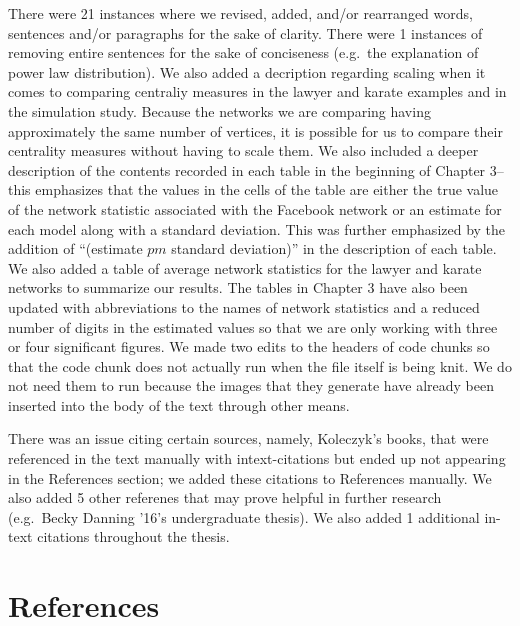 \documentclass[12pt,twoside]{amherstthesis}
\begin{document}
  There were 21 instances where we revised, added, and/or rearranged
  words, sentences and/or paragraphs for the sake of clarity. There were 1
  instances of removing entire sentences for the sake of conciseness
  (e.g.~the explanation of power law distribution). We also added a
  decription regarding scaling when it comes to comparing centraliy
  measures in the lawyer and karate examples and in the simulation study.
  Because the networks we are comparing having approximately the same
  number of vertices, it is possible for us to compare their centrality
  measures without having to scale them. We also included a deeper
  description of the contents recorded in each table in the beginning of
  Chapter 3--this emphasizes that the values in the cells of the table are
  either the true value of the network statistic associated with the
  Facebook network or an estimate for each model along with a standard
  deviation. This was further emphasized by the addition of ``(estimate
  \(pm\) standard deviation)'' in the description of each table. We also
  added a table of average network statistics for the lawyer and karate
  networks to summarize our results. The tables in Chapter 3 have also
  been updated with abbreviations to the names of network statistics and a
  reduced number of digits in the estimated values so that we are only
  working with three or four significant figures. We made two edits to the
  headers of code chunks so that the code chunk does not actually run when
  the file itself is being knit. We do not need them to run because the
  images that they generate have already been inserted into the body of
  the text through other means.
  
  There was an issue citing certain sources, namely, Koleczyk's books,
  that were referenced in the text manually with intext-citations but
  ended up not appearing in the References section; we added these
  citations to References manually. We also added 5 other referenes that
  may prove helpful in further research (e.g.~Becky Danning '16's
  undergraduate thesis). We also added 1 additional in-text citations
  throughout the thesis.
  
  \singlespacing
  
  \backmatter
  
  \chapter{References}\label{references}
  
  \noindent
  
\end{document}
